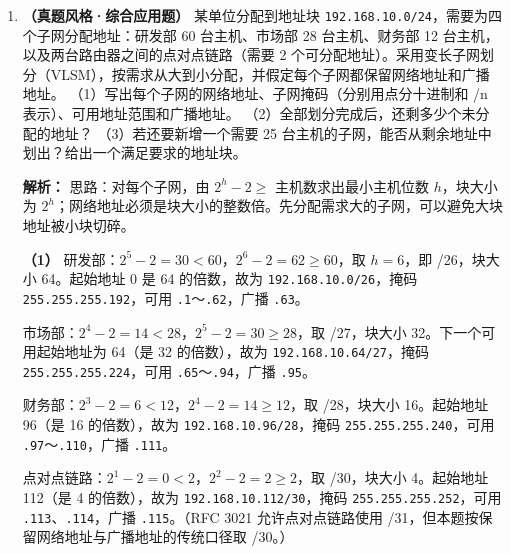 \begin{enumerate}[start=7]
\ifshowsolutions\par\noindent\textbf{解析：} H1 用掩码 /24 判断出 \texttt{10.0.0.20} 不在本网络 \texttt{192.168.1.0/24} 内，因此要把数据报交给默认网关。链路层只能把帧送到同一局域网内的某个 MAC 地址，所以 H1 广播 ARP 请求询问 \texttt{192.168.1.1}，R1 单播应答其 LAN1 接口的 MAC 地址。H1 发出的帧源 MAC 为 H1、目的 MAC 为 R1 的 LAN1 接口；IP 首部的源、目的地址分别为 \texttt{192.168.1.10} 和 \texttt{10.0.0.20}，在整个路径上保持不变（无 NAT）。R1 转发时只重新封装下一段链路的帧，改写的是链路层源、目的 MAC，不是 IP 地址。\else \answerarea[6] \fi

\item \textbf{（真题风格·综合应用题）} 某单位分配到地址块 \texttt{192.168.10.0/24}，需要为四个子网分配地址：研发部 60 台主机、市场部 28 台主机、财务部 12 台主机，以及两台路由器之间的点对点链路（需要 2 个可分配地址）。采用变长子网划分（VLSM），按需求从大到小分配，并假定每个子网都保留网络地址和广播地址。
（1）写出每个子网的网络地址、子网掩码（分别用点分十进制和 /n 表示）、可用地址范围和广播地址。
（2）全部划分完成后，还剩多少个未分配的地址？
（3）若还要新增一个需要 25 台主机的子网，能否从剩余地址中划出？给出一个满足要求的地址块。

\ifshowsolutions\par\noindent\textbf{解析：} 思路：对每个子网，由 $2^h-2\ge$ 主机数求出最小主机位数 $h$，块大小为 $2^h$；网络地址必须是块大小的整数倍。先分配需求大的子网，可以避免大块地址被小块切碎。

\textbf{（1）} 研发部：$2^5-2=30<60$，$2^6-2=62\ge60$，取 $h=6$，即 /26，块大小 64。起始地址 0 是 64 的倍数，故为 \texttt{192.168.10.0/26}，掩码 \texttt{255.255.255.192}，可用 \texttt{.1}～\texttt{.62}，广播 \texttt{.63}。

市场部：$2^4-2=14<28$，$2^5-2=30\ge28$，取 /27，块大小 32。下一个可用起始地址为 64（是 32 的倍数），故为 \texttt{192.168.10.64/27}，掩码 \texttt{255.255.255.224}，可用 \texttt{.65}～\texttt{.94}，广播 \texttt{.95}。

财务部：$2^3-2=6<12$，$2^4-2=14\ge12$，取 /28，块大小 16。起始地址 96（是 16 的倍数），故为 \texttt{192.168.10.96/28}，掩码 \texttt{255.255.255.240}，可用 \texttt{.97}～\texttt{.110}，广播 \texttt{.111}。

点对点链路：$2^1-2=0<2$，$2^2-2=2\ge2$，取 /30，块大小 4。起始地址 112（是 4 的倍数），故为 \texttt{192.168.10.112/30}，掩码 \texttt{255.255.255.252}，可用 \texttt{.113}、\texttt{.114}，广播 \texttt{.115}。（RFC 3021 允许点对点链路使用 /31，但本题按保留网络地址与广播地址的传统口径取 /30。）


\end{enumerate}
